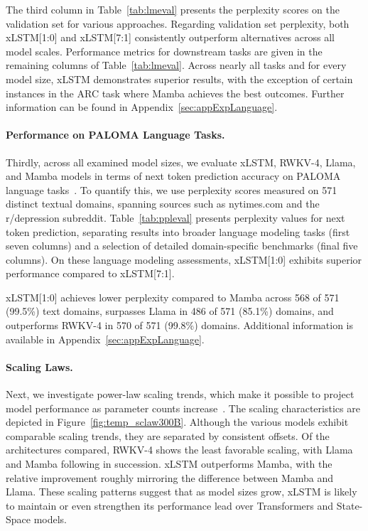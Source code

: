The third column in Table~\ref{tab:lmeval} presents the perplexity scores on the validation set for various approaches. Regarding validation set perplexity, both xLSTM[1:0] and xLSTM[7:1] consistently outperform alternatives across all model scales. Performance metrics for downstream tasks are given in the remaining columns of Table~\ref{tab:lmeval}. Across nearly all tasks and for every model size, xLSTM demonstrates superior results, with the exception of certain instances in the ARC task where Mamba achieves the best outcomes. Further information can be found in Appendix~\ref{sec:appExpLanguage}.

\paragraph{Performance on PALOMA Language Tasks.} Thirdly, across all examined model sizes, we evaluate xLSTM, RWKV-4, Llama, and Mamba models in terms of next token prediction accuracy on PALOMA language tasks~\citep{Magnusson:23arxivshort}. To quantify this, we use perplexity scores measured on 571 distinct textual domains, spanning sources such as nytimes.com and the r/depression subreddit. Table~\ref{tab:ppleval} presents perplexity values for next token prediction, separating results into broader language modeling tasks (first seven columns) and a selection of detailed domain-specific benchmarks (final five columns). On these language modeling assessments, xLSTM[1:0] exhibits superior performance compared to xLSTM[7:1].

xLSTM[1:0] achieves lower perplexity compared to Mamba across 568 of 571 (99.5\%) text domains, surpasses Llama in 486 of 571 (85.1\%) domains, and outperforms RWKV-4 in 570 of 571 (99.8\%) domains. Additional information is available in Appendix~\ref{sec:appExpLanguage}.

\paragraph{Scaling Laws.} Next, we investigate power-law scaling trends, which make it possible to project model performance as parameter counts increase~\citep{Kaplan:20,Brown:20short}. 
The scaling characteristics are depicted in Figure~\ref{fig:temp_sclaw300B}. Although the various models exhibit comparable scaling trends, they are separated by consistent offsets. Of the architectures compared, RWKV-4 shows the least favorable scaling, with Llama and Mamba following in succession. xLSTM outperforms Mamba, with the relative improvement roughly mirroring the difference between Mamba and Llama. These scaling patterns suggest that as model sizes grow, xLSTM is likely to maintain or even strengthen its performance lead over Transformers and State-Space models.

